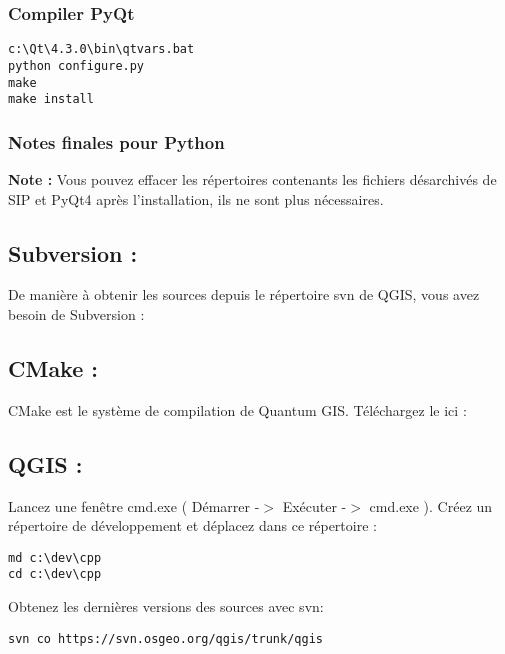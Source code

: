 \subsubsection{Compiler PyQt}
\begin{verbatim}
c:\Qt\4.3.0\bin\qtvars.bat 
python configure.py 
make 
make install 
\end{verbatim}

\subsubsection{Notes finales pour Python}

\textbf{Note :} Vous pouvez effacer les répertoires contenants les fichiers désarchivés de SIP et PyQt4 après l'installation, ils ne sont plus nécessaires.

\subsection{Subversion :}
De manière à obtenir les sources depuis le répertoire svn de QGIS, vous avez besoin de Subversion :


\subsection{CMake :}
CMake est le système de compilation de Quantum GIS. Téléchargez le ici :


\subsection{QGIS :}
Lancez une fenêtre cmd.exe ( Démarrer -$>$ Exécuter -$>$ cmd.exe ). Créez un répertoire de développement et déplacez dans ce répertoire :

\begin{verbatim}
md c:\dev\cpp 
cd c:\dev\cpp 
\end{verbatim}

Obtenez les dernières versions des sources avec svn:

\begin{verbatim}
svn co https://svn.osgeo.org/qgis/trunk/qgis 
\end{verbatim}

